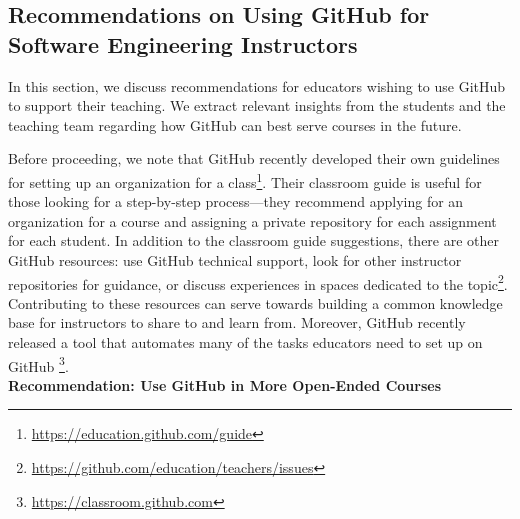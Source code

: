 \subsection{Recommendations on Using GitHub for Software Engineering Instructors}


In this section, we discuss recommendations for educators wishing to use GitHub to support their teaching. We extract relevant insights from the students and the teaching team regarding how GitHub can best serve courses in the future.

Before proceeding, we note that GitHub recently developed their own guidelines for setting up an organization for a class\footnote{\url{https://education.github.com/guide}}. Their classroom guide is useful for those looking for a step-by-step process---they recommend applying for an organization for a course and assigning a private repository for each assignment for each student. In addition to the classroom guide suggestions, there are other GitHub resources: use GitHub technical support, look for other instructor repositories for guidance, or discuss experiences in spaces dedicated to the topic\footnote{\url{https://github.com/education/teachers/issues}}. Contributing to these resources can serve towards building a common knowledge base for instructors to share to and learn from. Moreover, GitHub recently released a tool that automates many of the tasks educators need to set up on GitHub \footnote{\url{https://classroom.github.com}}. \\

\textbf{Recommendation: Use GitHub in More Open-Ended Courses} \\

